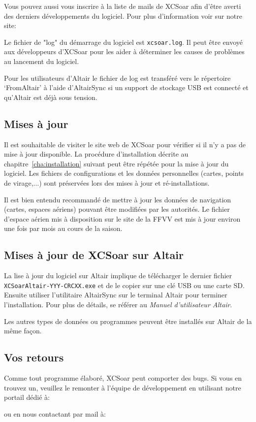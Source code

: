 Vous pouvez aussi vous inscrire à la liste de mails de XCSoar afin d'être averti des derniers développements du logiciel. Pour plus d'information voir sur notre site:
\begin{quote}
\end{quote}

Le fichier de "log" du démarrage du logiciel est \verb|xcsoar.log|. Il peut être envoyé aux développeurs d'XCSoar pour les aider à déterminer les causes de problèmes au lancement du logiciel.

Pour les utilisateurs d'Altair le fichier de log est transféré vers le répertoire `FromAltair' à l'aide d'AltairSync si un support de stockage USB est connecté et qu'Altair est déjà sous tension.

\subsection*{Mises à jour}
Il est souhaitable de visiter le site web de XCSoar pour vérifier si il n'y a pas de mise à jour disponible. La procédure d'installation décrite au chapitre~\ref{cha:installation} suivant peut être répétée pour la mise à jour du logiciel. Les fichiers de configurations et les données personnelles (cartes, points de virage,...) sont préservées lors des mises à jour et ré-installations.

Il est bien entendu recommandé de mettre à jour les données de navigation (cartes, espaces aériens) pouvant être modifiées par les autorités. Le fichier d'espace aérien mis à disposition sur le site de la FFVV est mis à jour environ une fois par mois au cours de la saison.

\subsection*{Mises à jour de XCSoar sur Altair}
La lise à jour du logiciel sur Altair implique de télécharger le dernier fichier {\tt XCSoarAltair-YYY-CRCXX.exe} et de le copier sur une clé USB ou une carte SD. Ensuite utiliser l'utilitaire AltairSync sur le terminal Altair pour terminer l'installation. Pour plus de détails, se référer au {\em Manuel d'utilisateur Altair}.

Les autres types de données ou programmes peuvent être installés sur Altair de la même façon.

\subsection*{Vos retours}
Comme tout programme élaboré, XCSoar peut comporter des bugs. Si vous en trouvez un, veuillez le remonter à l'équipe de développement en utilisant notre portail dédié à:
\begin{quote}
\end{quote}
ou en nous contactant par mail à:

